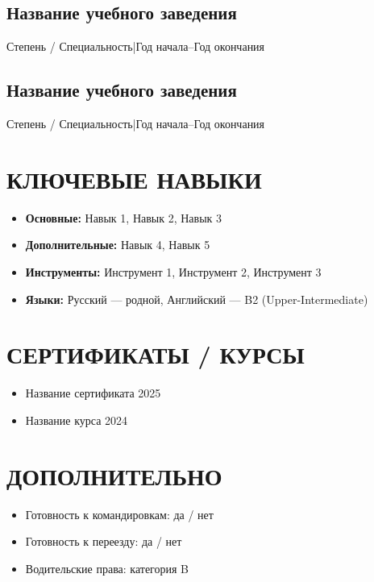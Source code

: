 \documentclass[11pt,a4paper]{article}
\newcommand{\edentry}[4]{
  \subsection*{#1}
  {\small\color{cvgray}#2\enspace|\enspace#3\enspace–\enspace#4}\par
  \vspace{0.3em}
}
\newcommand{\certentry}[2]{
  \item #1 \hfill \small\color{cvgray}#2
}
\begin{document}
\edentry{Название учебного заведения}{Степень / Специальность}{Год начала}{Год окончания}

\edentry{Название учебного заведения}{Степень / Специальность}{Год начала}{Год окончания}

\section{КЛЮЧЕВЫЕ НАВЫКИ}

\begin{itemize}[leftmargin=*,nosep]
  \item \textbf{Основные:} Навык 1, Навык 2, Навык 3
  \item \textbf{Дополнительные:} Навык 4, Навык 5
  \item \textbf{Инструменты:} Инструмент 1, Инструмент 2, Инструмент 3
  \item \textbf{Языки:} Русский — родной, Английский — B2 (Upper-Intermediate)
\end{itemize}

\section{СЕРТИФИКАТЫ / КУРСЫ}

\begin{itemize}[leftmargin=*,nosep]
  \certentry{Название сертификата}{2025}
  \certentry{Название курса}{2024}
\end{itemize}

\section{ДОПОЛНИТЕЛЬНО}

\begin{itemize}[leftmargin=*,nosep]
  \item Готовность к командировкам: да / нет
  \item Готовность к переезду: да / нет
  \item Водительские права: категория B
\end{itemize}
\end{document}
